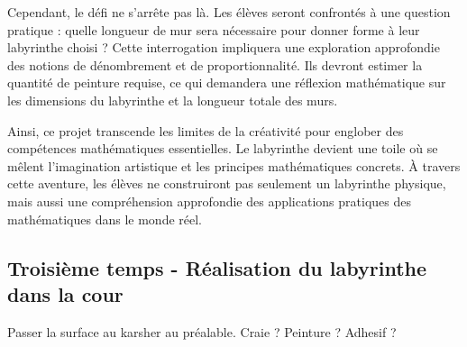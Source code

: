 Cependant, le défi ne s'arrête pas là. Les élèves seront confrontés à une question pratique : quelle longueur de mur sera nécessaire pour
donner forme à leur labyrinthe choisi ? Cette interrogation impliquera une exploration approfondie des notions de dénombrement et de proportionnalité.
Ils devront estimer la quantité de peinture requise, ce qui demandera une réflexion mathématique sur les dimensions du labyrinthe et
la longueur totale des murs.

Ainsi, ce projet transcende les limites de la créativité pour englober des compétences mathématiques essentielles. Le labyrinthe devient
une toile où se mêlent l'imagination artistique et les principes mathématiques concrets. À travers cette aventure, les élèves ne
construiront pas seulement un labyrinthe physique, mais aussi une compréhension approfondie des applications pratiques des mathématiques
dans le monde réel.

\subsection{Troisième temps - Réalisation du labyrinthe dans la cour}
Passer la surface au karsher au préalable.
Craie ? Peinture ? Adhesif ? 